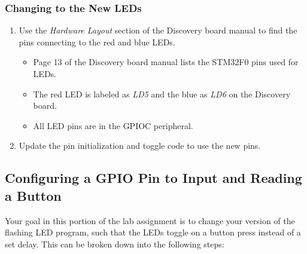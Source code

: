 \documentclass[openany,11pt,fleqn]{book} %
\begin{document}
\subsubsection{Changing to the New LEDs}

\begin{enumerate}
    \item Use the \textit{Hardware Layout} section of the Discovery board manual to find the pins connecting to the red and blue LEDs.  
    \begin{itemize}
        \item Page 13 of the Discovery board manual lists the STM32F0 pins used for LEDs.
        \item The red LED is labeled as \textit{LD5} and the blue as \textit{LD6} on the Discovery board.
        \item All LED pins are in the GPIOC peripheral. 
    \end{itemize}
    \item Update the pin initialization and toggle code to use the new pins.
\end{enumerate}


\subsection{Configuring a GPIO Pin to Input and Reading a Button}

Your goal in this portion of the lab assignment is to change your version of the flashing LED program, such that the LEDs toggle on a button press instead of a set delay. This can be broken down into the following steps:
\end{document}
